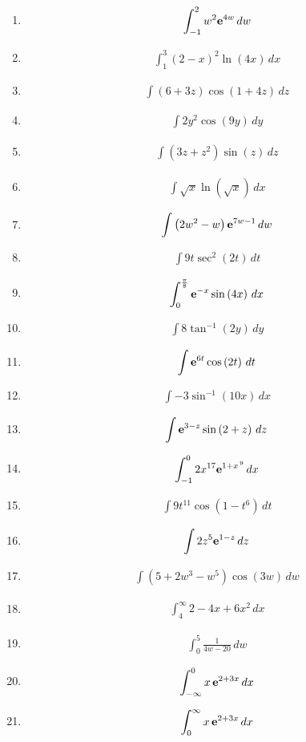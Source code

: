 \documentclass[twoside, fleqn,12pt,letterpaper]{book}
\newcommand{\makeitem}[2]{\item {#2}\begin{align*} {#1}
  \end{align*}}
\newcommand{\makeitemlamar}[1]{\makeitem{{#1}}{\cite{lamar}}}
\begin{document}
\begin{multicols}{2}
\begin{enumerate}
  \makeitemlamar{\displaystyle \int_{{ - 1}}^{2}{{{w^2}{{\bf{e}}^{4w}}\,dw}}}
  
  \makeitemlamar{\displaystyle \int_{1}^{3}{{{{\left( {2 - x} \right)}^2}\ln \left( {4x} \right)\,dx}}}
  
  \makeitemlamar{\displaystyle \int{{\left( {6 + 3z} \right)\cos \left( {1 + 4z} \right)\,dz}}}
  
  \makeitemlamar{\displaystyle \int{{2{y^2}\cos \left( {9y} \right)\,dy}}}
  
  \makeitemlamar{\displaystyle \int{{\left( {3z + {z^2}} \right)\sin \left( z \right)\,dz}}}
  
  \makeitemlamar{\int \sqrt{x}\ln{(\sqrt{x})} \, dx }
  
  \makeitemlamar{\displaystyle \int{{\left( {2{w^2} - w} \right){{\bf{e}}^{7w - 1}}\,dw}}}
  
  \makeitemlamar{\displaystyle \int{{9t{{\sec }^2}\left( {2t} \right)\,dt}}}
  
  \makeitemlamar{\displaystyle \int_{0}^{{\frac{\pi }{8}}}{{{{\bf{e}}^{ - x}}\sin \left( {4x} \right)\,dx}}}
  
  \makeitemlamar{\displaystyle \int{{8{{\tan }^{ - 1}}\left( {2y} \right)\,dy}}}
  
  \makeitemlamar{\displaystyle \int{{{{\bf{e}}^{6t}}\cos \left( {2t} \right)\,dt}}}
  
  \makeitemlamar{\displaystyle \int{{ - 3{{\sin }^{ - 1}}\left( {10x} \right)\,dx}}}
  
  \makeitemlamar{\displaystyle \int{{{{\bf{e}}^{3 - z}}\sin \left( {2 + z} \right)\,dz}}}
  
  \makeitemlamar{\displaystyle \int_{{ - 1}}^{0}{{2{x^{17}}{{\bf{e}}^{1 + {x^{\,9}}}}\,dx}}}
  
  \makeitemlamar{\displaystyle \int{{9{t^{11}}\cos \left( {1 - {t^6}} \right)\,dt}}}
  
  \makeitemlamar{\displaystyle \int{{2{z^5}{{\bf{e}}^{1 - z}}\,dz}}}
  
  \makeitemlamar{\displaystyle \int{{\left( {5 + 2{w^3} - {w^5}} \right)\cos \left( {3w} \right)\,dw}}}
  
  \makeitemlamar{\displaystyle \int_{4}^{\infty }{{2 - 4x + 6{x^2}\,dx}}}
  
  \makeitemlamar{\displaystyle \int_{0}^{5}{{\frac{1}{{4w - 20}}\,dw}}}
  
  \makeitemlamar{\displaystyle \int_{{ - \infty }}^{0}{{x\,{{\bf{e}}^{2 + 3x}}\,dx}}}
  
  \makeitemlamar{\displaystyle \int_{0}^{\infty }{{x\,{{\bf{e}}^{2 + 3x}}\,dx}}}
  

\end{enumerate}
\end{multicols}
\end{document}
